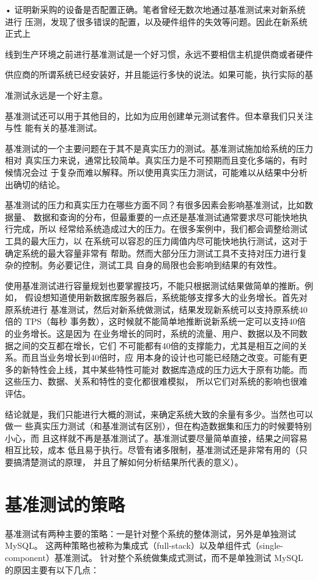• 证明新采购的设备是否配置正确。笔者曾经无数次地通过基准测试来对新系统进行
压测，发现了很多错误的配置，以及硬件组件的失效等问题。因此在新系统正式上

线到生产环境之前进行基准测试是一个好习惯，永远不要相信主机提供商或者硬件

供应商的所谓系统已经安装好，并且能运行多快的说法。如果可能，执行实际的基

准测试永远是一个好主意。

基准测试还可以用于其他目的，比如为应用创建单元测试套件。但本章我们只关注与性
能有关的基准测试。

基准测试的一个主要问题在于其不是真实压力的测试。基准测试施加给系统的压力相对
真实压力来说，通常比较简单。真实压力是不可预期而且变化多端的，有时候情况会过
于复杂而难以解释。所以使用真实压力测试，可能难以从结果中分析出确切的结论。

基准测试的压力和真实压力在哪些方面不同？有很多因素会影响基准测试，比如数据量、
数据和查询的分布，但最重要的一点还是基准测试通常要求尽可能快地执行完成，所以
经常给系统造成过大的压力。在很多案例中，我们都会调整给测试工具的最大压力，以
在系统可以容忍的压力阈值内尽可能快地执行测试，这对于确定系统的最大容量非常有
帮助。然而大部分压力测试工具不支持对压力进行复杂的控制。务必要记住，测试工具
自身的局限也会影响到结果的有效性。

使用基准测试进行容量规划也要掌握技巧，不能只根据测试结果做简单的推断。例如，
假设想知道使用新数据库服务器后，系统能够支撑多大的业务增长。首先对原系统进行
基准测试，然后对新系统做测试，结果发现新系统可以支持原系统40倍的 TPS（每秒
事务数），这时候就不能简单地推断说新系统一定可以支持40倍的业务增长。这是因为
在业务增长的同时，系统的流量、用户、数据以及不同数据之间的交互都在增长，它们
不可能都有40倍的支撑能力，尤其是相互之间的关系。而且当业务增长到40倍时，应
用本身的设计也可能已经随之改变。可能有更多的新特性会上线，其中某些特性可能对
数据库造成的压力远大于原有功能。而这些压力、数据、关系和特性的变化都很难模拟，
所以它们对系统的影响也很难评估。

结论就是，我们只能进行大概的测试，来确定系统大致的余量有多少。当然也可以做一
些真实压力测试（和基准测试有区别），但在构造数据集和压力的时候要特别小心，而
且这样就不再是基准测试了。基准测试要尽量简单直接，结果之间容易相互比较，成本
低且易于执行。尽管有诸多限制，基准测试还是非常有用的（只要搞清楚测试的原理，
并且了解如何分析结果所代表的意义）。

\section{基准测试的策略}
基准测试有两种主要的策略：一是针对整个系统的整体测试，另外是单独测试 MySQL。
这两种策略也被称为集成式（full-stack）以及单组件式（single-component）基准测试。
针对整个系统做集成式测试，而不是单独测试 MySQL 的原因主要有以下几点：

